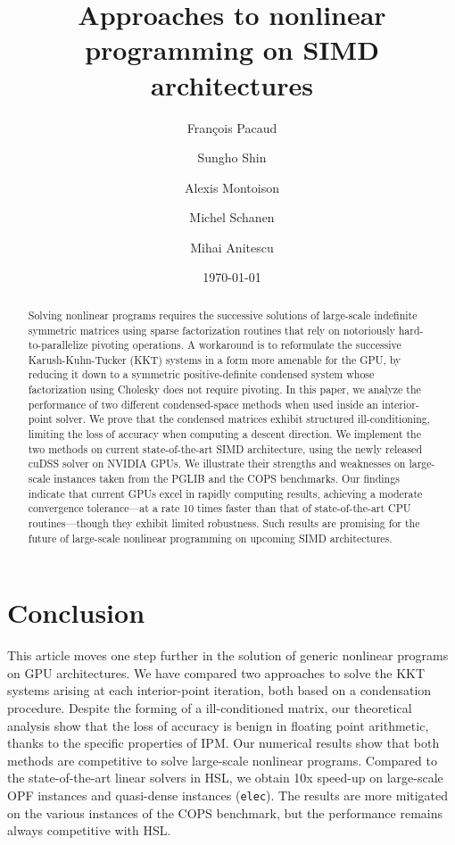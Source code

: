 \documentclass{article}
\title{Approaches to nonlinear programming on SIMD architectures}
\author{François Pacaud \and
Sungho Shin \and
Alexis Montoison \and
Michel Schanen \and
Mihai Anitescu
}
\date{\today}
\theoremstyle{definition}
\theoremstyle{remark}
\begin{document}
\maketitle

\begin{abstract}
  Solving nonlinear programs requires the
  successive solutions of large-scale indefinite symmetric matrices using
  sparse factorization routines that rely
  on notoriously hard-to-parallelize pivoting operations.
  A workaround is to reformulate the successive Karush-Kuhn-Tucker (KKT) systems
  in a form more amenable for the GPU,
  by reducing it down to a symmetric positive-definite condensed
  system whose factorization using Cholesky does not require pivoting.
  In this paper, we analyze the performance of two different condensed-space methods
  when used inside an interior-point solver.
  We prove that the condensed matrices exhibit structured ill-conditioning,
  limiting the loss of accuracy when computing a descent direction.
  We implement the two methods on current state-of-the-art SIMD architecture, using the newly
  released cuDSS solver on NVIDIA GPUs. We illustrate their strengths and weaknesses
  on large-scale instances taken from the PGLIB and the COPS benchmarks.
  Our findings indicate that current GPUs excel in rapidly computing results,
  achieving a moderate convergence tolerance---at a rate 10 times faster
  than that of state-of-the-art CPU routines---though they exhibit
  limited robustness. Such results are promising for the future of large-scale nonlinear programming on upcoming SIMD architectures.
\end{abstract}










\section{Conclusion}
This article moves one step further in the solution of generic nonlinear
programs on GPU architectures. We have compared two approaches
to solve the KKT systems arising at each interior-point iteration, both
based on a condensation procedure. Despite the forming of a ill-conditioned
matrix, our theoretical analysis show that the loss of accuracy is benign
in floating point arithmetic, thanks to the specific properties of IPM.
Our numerical results show that both methods are competitive to solve large-scale
nonlinear programs. Compared to the state-of-the-art linear solvers in HSL, we obtain 10x speed-up on large-scale OPF instances
and quasi-dense instances ({\tt elec}). The results are more mitigated
on the various instances of the COPS benchmark, but the performance remains
always competitive with HSL.
\end{document}
